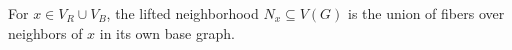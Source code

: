 \begin{definition}
For \(x\in V_R\cup V_B\), the lifted neighborhood \(N_x\subseteq V(G)\) is the
union of fibers over neighbors of \(x\) in its own base graph.
\end{definition}
